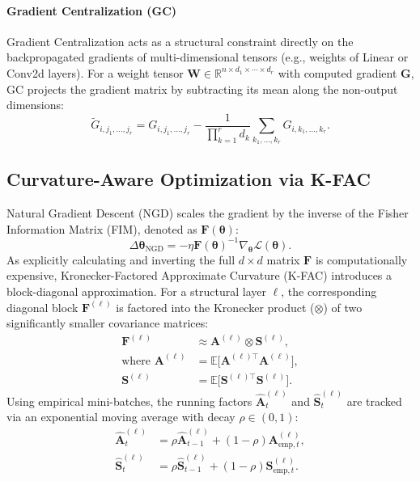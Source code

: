 \documentclass[conference]{IEEEtran}
\begin{document}
\paragraph{Gradient Centralization (GC)} Gradient Centralization acts as a structural constraint directly on the backpropagated gradients of multi-dimensional tensors (e.g., weights of Linear or Conv2d layers). For a weight tensor $\mathbf{W} \in \mathbb{R}^{n \times d_1 \times \cdots \times d_r}$ with computed gradient $\mathbf{G}$, GC projects the gradient matrix by subtracting its mean along the non-output dimensions:
\begin{equation}
\tilde{G}_{i, j_1, \dots, j_r} = G_{i, j_1, \dots, j_r} - \frac{1}{\prod_{k=1}^r d_k} \sum_{k_1,\dots,k_r} G_{i, k_1, \dots, k_r}.
\label{eq:gradient_centralization}
\end{equation}

\subsection{Curvature-Aware Optimization via K-FAC}
\label{subsec:kfac_bg}

Natural Gradient Descent (NGD) scales the gradient by the inverse of the Fisher Information Matrix (FIM), denoted as $\mathbf{F}(\boldsymbol{\theta})$:
\begin{equation}
\Delta \boldsymbol{\theta}_{\mathrm{NGD}} = -\eta \mathbf{F}(\boldsymbol{\theta})^{-1} \nabla_{\boldsymbol{\theta}} \mathcal{L}(\boldsymbol{\theta}).
\label{eq:ngd}
\end{equation}
As explicitly calculating and inverting the full $d \times d$ matrix $\mathbf{F}$ is computationally expensive, Kronecker-Factored Approximate Curvature (K-FAC) introduces a block-diagonal approximation. For a structural layer $\ell$, the corresponding diagonal block $\mathbf{F}^{(\ell)}$ is factored into the Kronecker product ($\otimes$) of two significantly smaller covariance matrices:
\begin{equation}
\begin{aligned}
\mathbf{F}^{(\ell)} &\approx \mathbf{A}^{(\ell)} \otimes \mathbf{S}^{(\ell)}, \\
\text{where } \mathbf{A}^{(\ell)} &= \mathbb{E}\bigl[\mathbf{A}^{(\ell)\top}\mathbf{A}^{(\ell)}\bigr], \\
\mathbf{S}^{(\ell)} &= \mathbb{E}\bigl[\mathbf{S}^{(\ell)\top}\mathbf{S}^{(\ell)}\bigr].
\end{aligned}
\end{equation}
Using empirical mini-batches, the running factors $\hat{\mathbf{A}}^{(\ell)}_t$ and $\hat{\mathbf{S}}^{(\ell)}_t$ are tracked via an exponential moving average with decay $\rho \in (0, 1)$:
\begin{equation}
\label{eq:kfac_ema}
\begin{aligned}
\hat{\mathbf{A}}^{(\ell)}_t &= \rho \hat{\mathbf{A}}^{(\ell)}_{t-1} + (1-\rho)\mathbf{A}^{(\ell)}_{\text{emp},t}, \\
\hat{\mathbf{S}}^{(\ell)}_t &= \rho \hat{\mathbf{S}}^{(\ell)}_{t-1} + (1-\rho)\mathbf{S}^{(\ell)}_{\text{emp},t}.
\end{aligned}
\end{equation}
\end{document}
